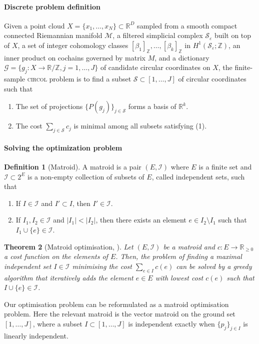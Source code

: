 \documentclass[a4paper,11pt, DIV=10]{scrartcl}
\numberwithin{equation}{section}
\newtheorem{theorem}{Theorem}[section]
\theoremstyle{definition}
\newtheorem{definition}[theorem]{Definition}
\theoremstyle{remark}
\newcommand{\Z}{\mathbb{Z}}
\newcommand{\R}{\mathbb{R}}
\newcommand{\mc}[1]{\mathcal{#1}}
\begin{document}
\paragraph{Discrete problem definition}
Given a point cloud $X=\{x_1,\dots, x_N\}\subset \R^D$ sampled from a smooth compact connected Riemannian manifold $\mc{M}$, a filtered simplicial complex $\mc{S}_\varepsilon$ built on top of $X$, a set of integer cohomology classes $[\beta_1]_\Z,\dots, [\beta_k]_\Z$ in $H^1(\mc{S}_\varepsilon;\Z)$, an inner product on cochains governed by matrix $M$, and a dictionary $\mathcal{G}=\{g_j\colon X\to \R/\Z, j=1,\dots, J\}$ of candidate circular coordinates on $X$, the finite-sample \textsc{circol} problem is to find a subset $\mc{S}\subset [1,\dots, J]$ of circular coordinates such that
\begin{enumerate}
	\item The set of projections $\{P(g_j)\}_{j\in \mc{S}}$ forms a basis of $\R^k$.
	\item The cost $\sum_{j\in \mc{S}} c_j$ is minimal among all subsets satisfying (1).
\end{enumerate}

\paragraph{Solving the optimization problem}
\begin{definition}[Matroid]
A matroid is a pair $(E,\mc{I})$ where $E$ is a finite set and $\mc{I}\subset 2^E$ is a non-empty collection of subsets of $E$, called independent sets, such that
\begin{enumerate}
	\item If $I\in \mc{I}$ and $I'\subset I$, then $I'\in \mc{I}$.
	\item If $I_1, I_2\in \mc{I}$ and $\lvert I_1 \rvert < \lvert I_2 \rvert$, then there exists an element $e\in I_2\setminus I_1$ such that $I_1 \cup \{e\}\in \mc{I}$.
\end{enumerate}
\end{definition}

\begin{theorem}[Matroid optimisation, \cite{edmonds1971matroids}]
Let $(E,\mc{I})$ be a matroid and $c\colon E\to \R_{\geq 0}$ a cost function on the elements of $E$.
Then, the problem of finding a maximal independent set $I\in \mc{I}$ minimising the cost $\sum_{e\in I} c(e)$ can be solved by a greedy algorithm that iteratively adds the element $e\in E$ with lowest cost $c(e)$ such that $I\cup \{e\}\in \mc{I}$.
\end{theorem}
Our optimisation problem can be reformulated as a matroid optimisation problem.
Here the relevant matroid is the vector matroid on the ground set $[1,\dots,J]$, where a subset $I\subset [1,\dots,J]$ is independent exactly when $\{p_j\}_{j\in I}$ is linearly independent.
\end{document}

